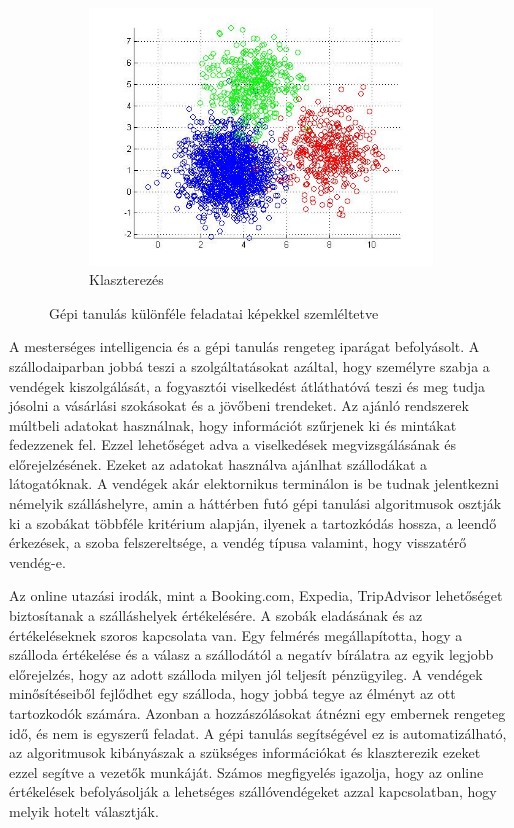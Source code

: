 \begin{figure}[h]
\begin{subfigure}{0.3\textwidth}
        \includegraphics[width=1\linewidth]{images/2.fejezet/klaszterezes.jpg}
        \caption{Klaszterezés}
        \label{fig:klaszterezes}
    \end{subfigure}
    
    \caption{Gépi tanulás különféle feladatai képekkel szemléltetve}
\end{figure}

A mesterséges intelligencia és a gépi tanulás rengeteg iparágat befolyásolt. A szállodaiparban jobbá teszi a szolgáltatásokat azáltal, hogy személyre szabja a vendégek kiszolgálását, a fogyasztói viselkedést átláthatóvá teszi és meg tudja jósolni a vásárlási szokásokat és a jövőbeni trendeket. Az ajánló rendszerek múltbeli adatokat használnak, hogy információt szűrjenek ki és mintákat fedezzenek fel. Ezzel lehetőséget adva a viselkedések megvizsgálásának és előrejelzésének. Ezeket az adatokat használva ajánlhat szállodákat a látogatóknak. A vendégek akár elektornikus terminálon is be tudnak jelentkezni némelyik szálláshelyre, amin a háttérben futó gépi tanulási algoritmusok osztják ki a szobákat többféle kritérium alapján, ilyenek a tartozkódás hossza, a leendő érkezések, a szoba felszereltsége, a vendég típusa valamint, hogy visszatérő vendég-e.

Az online utazási irodák, mint a Booking.com, Expedia, TripAdvisor lehetőséget biztosítanak a szálláshelyek értékelésére. A szobák eladásának és az értékeléseknek szoros kapcsolata van. Egy felmérés megállapította, hogy a szálloda értékelése és a válasz a szállodától a negatív bírálatra az egyik legjobb előrejelzés, hogy az adott szálloda milyen jól teljesít pénzügyileg. A vendégek minősítéseiből fejlődhet egy szálloda, hogy jobbá tegye az élményt az ott tartozkodók számára. Azonban a hozzászólásokat átnézni egy embernek rengeteg idő, és nem is egyszerű feladat. A gépi tanulás segítségével ez is automatizálható, az algoritmusok kibányászak a szükséges információkat és klaszterezik ezeket ezzel segítve a vezetők munkáját. Számos megfigyelés igazolja, hogy az online értékelések befolyásolják a lehetséges szállóvendégeket azzal kapcsolatban, hogy melyik hotelt választják.

